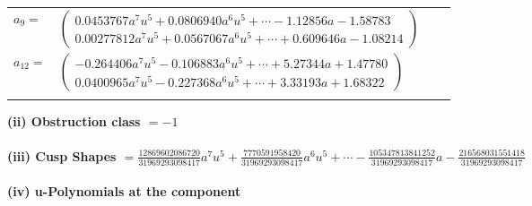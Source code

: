 \documentclass[1p]{elsarticle_modified}
\theoremstyle{definition}
\begin{document}
\begin{tabular}{m{7pt} m{180pt} m{7pt} m{180pt} }
\flushright $a_{9}=$&$\begin{pmatrix}0.0453767 a^{7} u^{5}+0.0806940 a^{6} u^{5}+\cdots-1.12856 a-1.58783\\0.00277812 a^{7} u^{5}+0.0567067 a^{6} u^{5}+\cdots+0.609646 a-1.08214\end{pmatrix}$ \\
\flushright $a_{12}=$&$\begin{pmatrix}-0.264406 a^{7} u^{5}-0.106883 a^{6} u^{5}+\cdots+5.27344 a+1.47780\\0.0400965 a^{7} u^{5}-0.227368 a^{6} u^{5}+\cdots+3.33193 a+1.68322\end{pmatrix}$\\&\end{tabular}
\flushleft \textbf{(ii) Obstruction class $= -1$}\\~\\
\flushleft \textbf{(iii) Cusp Shapes $= \frac{12869602086720}{31969293098417} a^7 u^5+\frac{7770591958420}{31969293098417} a^6 u^5+\cdots-\frac{105347813841252}{31969293098417} a-\frac{216568031551418}{31969293098417}$}\\~\\
\newpage\renewcommand{\arraystretch}{1}
\flushleft \textbf{(iv) u-Polynomials at the component}\newline \\
\end{document}
